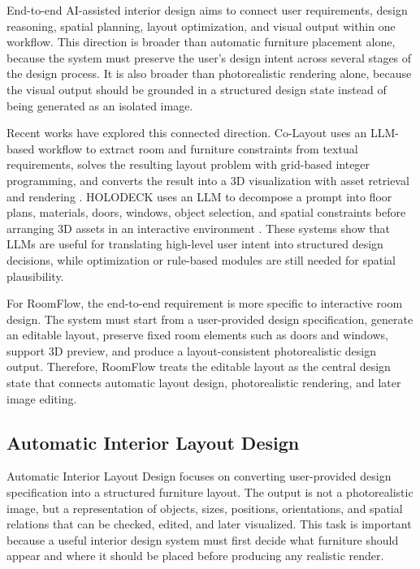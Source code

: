 End-to-end AI-assisted interior design aims to connect user requirements, design reasoning, spatial planning, layout optimization, and visual output within one workflow. This direction is broader than automatic furniture placement alone, because the system must preserve the user's design intent across several stages of the design process. It is also broader than photorealistic rendering alone, because the visual output should be grounded in a structured design state instead of being generated as an isolated image.

Recent works have explored this connected direction. Co-Layout uses an LLM-based workflow to extract room and furniture constraints from textual requirements, solves the resulting layout problem with grid-based integer programming, and converts the result into a 3D visualization with asset retrieval and rendering \cite{xiang2025colayout}. HOLODECK uses an LLM to decompose a prompt into floor plans, materials, doors, windows, object selection, and spatial constraints before arranging 3D assets in an interactive environment \cite{al2024HolodeckLanguageGuided}. These systems show that LLMs are useful for translating high-level user intent into structured design decisions, while optimization or rule-based modules are still needed for spatial plausibility.

For RoomFlow, the end-to-end requirement is more specific to interactive room design. The system must start from a user-provided design specification, generate an editable layout, preserve fixed room elements such as doors and windows, support 3D preview, and produce a layout-consistent photorealistic design output. Therefore, RoomFlow treats the editable layout as the central design state that connects automatic layout design, photorealistic rendering, and later image editing.

\subsection{Automatic Interior Layout Design}\label{subsec:ai-based-interior-layout-generation}

Automatic Interior Layout Design focuses on converting user-provided design specification into a structured furniture layout. The output is not a photorealistic image, but a representation of objects, sizes, positions, orientations, and spatial relations that can be checked, edited, and later visualized. This task is important because a useful interior design system must first decide what furniture should appear and where it should be placed before producing any realistic render.

